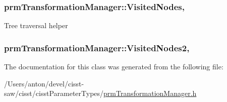 \subsubsection[{Visited\+Nodes}]{ prm\+Transformation\+Manager\+::\+Visited\+Nodes\hspace{0.3cm}{\ttfamily [static]}, {\ttfamily [protected]}}\label{classprm_transformation_manager_a5e3fe611cb19ecfdfa5edaea3a7920b0}
Tree traversal helper \hypertarget{classprm_transformation_manager_a667e73caad0b315c6b0bde485f5fd168}{}
\subsubsection[{Visited\+Nodes2}]{ prm\+Transformation\+Manager\+::\+Visited\+Nodes2\hspace{0.3cm}{\ttfamily [static]}, {\ttfamily [protected]}}\label{classprm_transformation_manager_a667e73caad0b315c6b0bde485f5fd168}


The documentation for this class was generated from the following file\+:\begin{DoxyCompactItemize}
\item 
/\+Users/anton/devel/cisst-\/saw/cisst/cisst\+Parameter\+Types/\hyperlink{prm_transformation_manager_8h}{prm\+Transformation\+Manager.\+h}\end{DoxyCompactItemize}
